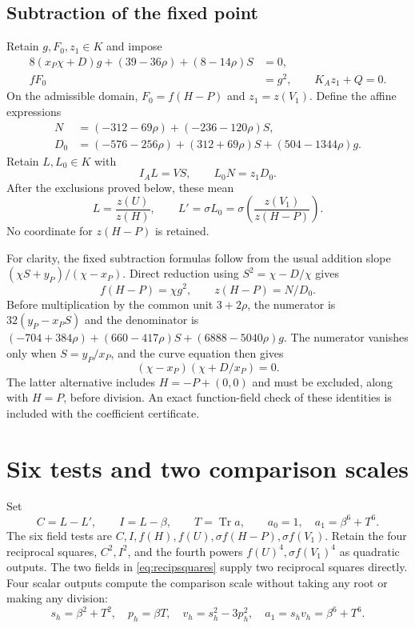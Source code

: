 \documentclass[11pt,a4paper]{article}
\DeclareMathOperator{\Tr}{Tr}\DeclareMathOperator{\Nm}{N}
\begin{document}
\subsection{Subtraction of the fixed point}

Retain $g,F_0,z_1\in K$ and impose
\begin{equation}\label{eq:fixedsubtract}
 \begin{split}
 8(x_P\chi+D)g+(39-36\rho)+(8-14\rho)S&=0,\\
 fF_0&=g^2,\qquad K_Az_1+Q=0.
 \end{split}
\end{equation}
On the admissible domain, $F_0=f(H-P)$ and $z_1=z(V_1)$.
Define the affine expressions
\begin{equation}\label{eq:ND}
 \begin{split}
 N&=(-312-69\rho)+(-236-120\rho)S,\\
 D_0&=(-576-256\rho)+(312+69\rho)S+(504-1344\rho)g.
 \end{split}
\end{equation}
Retain $L,L_0\in K$ with
\begin{equation}\label{eq:ratios}
                         I_AL=VS,\qquad L_0N=z_1D_0.
\end{equation}
After the exclusions proved below, these mean
\[
 L=\frac{z(U)}{z(H)},\qquad
 L'=\sigma L_0=\sigma\!\left(\frac{z(V_1)}{z(H-P)}\right).
\]
No coordinate for $z(H-P)$ is retained.

For clarity, the fixed subtraction formulas follow from the usual
addition slope $(\chi S+y_P)/(\chi-x_P)$.
Direct reduction using $S^2=\chi-D/\chi$ gives
\[
 f(H-P)=\chi g^2,\qquad z(H-P)=N/D_0.
\]
Before multiplication by the common unit $3+2\rho$, the numerator
is $32(y_P-x_PS)$ and the denominator is
$(-704+384\rho)+(660-417\rho)S+(6888-5040\rho)g$.
The numerator vanishes only when
$S=y_P/x_P$, and the curve equation then gives
\[
                    (\chi-x_P)(\chi+D/x_P)=0.
\]
The latter alternative includes $H=-P+(0,0)$ and must be excluded,
along with $H=P$, before division. An exact function-field check of
these identities is included with the coefficient certificate.

\section{Six tests and two comparison scales}

Set
\[
 C=L-L',\qquad I=L-\beta,\qquad T=\Tr a,
 \qquad a_0=1,\quad a_1=\beta^6+T^6.
\]
The six field tests are $C,I,f(H),f(U),\sigma f(H-P),\sigma f(V_1)$.
Retain the four reciprocal squares, $C^2,I^2$, and the fourth powers
$f(U)^4,\sigma f(V_1)^4$ as quadratic outputs. The two fields in
\eqref{eq:recipsquares} supply two reciprocal squares directly.
Four scalar outputs compute the comparison scale without taking any
root or making any division:
\[
 s_h=\beta^2+T^2,\quad p_h=\beta T,\quad
 v_h=s_h^2-3p_h^2,\quad a_1=s_hv_h=\beta^6+T^6.
\]
\end{document}
